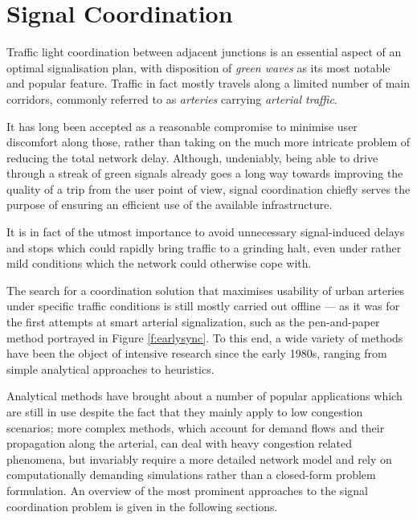 \section{Signal Coordination} \label{s:signalcoordination}

Traffic light coordination between adjacent junctions is an essential aspect of an
optimal signalisation plan, with disposition of \emph{green waves} as its most notable and popular
feature. Traffic in fact mostly travels along a limited number of main corridors, commonly referred
to as \emph{arteries} carrying \emph{arterial traffic}.

It has long been accepted as a reasonable compromise to minimise user discomfort along those, rather than taking on the much more intricate problem of reducing the total network delay.
Although, undeniably, being able to drive through a streak of green signals already goes a long way towards
improving the quality of a trip from the user point of view, signal coordination chiefly
serves the purpose of ensuring an efficient use of the available infrastructure.

It is in fact of the utmost importance to avoid unnecessary signal-induced delays and stops which could rapidly bring traffic to a grinding halt, even under rather mild conditions which the network could otherwise cope with.

The search for a coordination solution that maximises usability of urban arteries under specific traffic conditions is still mostly carried out offline — as it was for the first attempts at smart arterial signalization, such as the pen-and-paper method portrayed in Figure \ref{f:earlysync}.
To this end, a wide variety of methods have been the object of intensive research since the early 1980s, ranging from simple analytical approaches to heuristics.

Analytical methods have brought about a number of popular applications which are still in use despite the fact that they mainly apply to low congestion scenarios; more complex methods, which account for demand flows and their propagation along the arterial, can deal with heavy congestion related phenomena, but invariably require a more detailed network model and rely on computationally demanding simulations rather than a closed-form problem formulation. An overview of the most prominent approaches to the signal coordination problem is given in the following sections.

